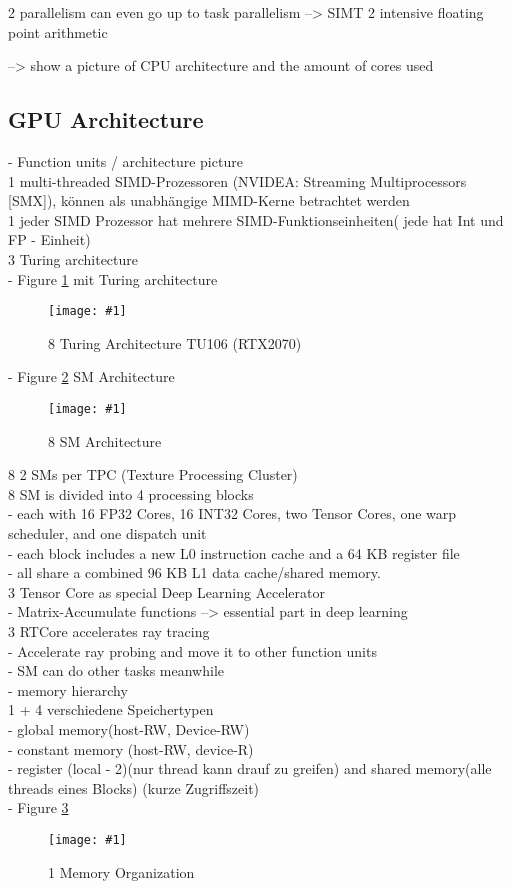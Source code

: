 \documentclass[a4paper,12pt]{llncs}
\numberwithin{equation}{section}
\newcommand{\bild}[4]{
  \begin{figure}[htbp]
    \begin{center}
      \texttt{[image: \#1]}
      \caption[#4]{#3}
      \label{#2}
    \end{center}
  \end{figure}
}
\newcommand{\bildbreite}[5]{
  \begin{figure}[htbp]
    \begin{center}
      \texttt{[image: \#1]}
      \caption[#5]{#4}
      \label{#3}
    \end{center}
  \end{figure}
}
\begin{document}
    2 parallelism can even go up to task parallelism --> SIMT
    2 intensive floating point arithmetic
  
  --> show a picture of CPU architecture and the amount of cores used
  
\subsection{GPU Architecture}
    - Function units / architecture picture\\
      1 multi-threaded SIMD-Prozessoren (NVIDEA: Streaming Multiprocessors [SMX]), können als unabhängige MIMD-Kerne betrachtet werden\\
      1 jeder SIMD Prozessor hat mehrere SIMD-Funktionseinheiten( jede hat Int und FP - Einheit)\\
	  3 Turing architecture\\
	  - Figure \ref{fig:turingOverall} mit Turing architecture\\
	  \bildbreite{figures/Turing_architecture.JPG}{6cm}{fig:turingOverall}{8 Turing Architecture TU106 (RTX2070)}{}
	  - Figure \ref{fig:smArch} SM Architecture\\
	  \bildbreite{figures/SM_arch.jpg}{4cm}{fig:smArch}{8 SM Architecture}{}
	  8 2 SMs per TPC (Texture Processing Cluster)\\
	  8 SM is divided into 4 processing blocks\\
	    - each with 16 FP32 Cores, 16 INT32 Cores, two Tensor Cores, one warp scheduler, and one dispatch unit\\
	    - each block includes a new L0 instruction cache and a 64 KB register file\\
	    - all share a combined 96 KB L1 data cache/shared memory.\\

	  3 Tensor Core as special Deep Learning Accelerator\\
	    - Matrix-Accumulate functions --> essential part in deep learning\\
	  3 RTCore accelerates ray tracing\\
	    - Accelerate ray probing and move it to other function units\\
	    - SM can do other tasks meanwhile\\
	  
	  
    - memory hierarchy\\
      1 + 4 verschiedene Speichertypen\\
        - global memory(host-RW, Device-RW)\\
        - constant memory (host-RW, device-R)\\
        - register (local - 2)(nur thread kann drauf zu greifen) and shared memory(alle threads eines Blocks) (kurze Zugriffszeit)\\
        - Figure \ref{fig:memorga}
    \bild{figures/speicheroragnisation.jpg}{fig:memorga}{1 Memory Organization}{}
        
\end{document}
